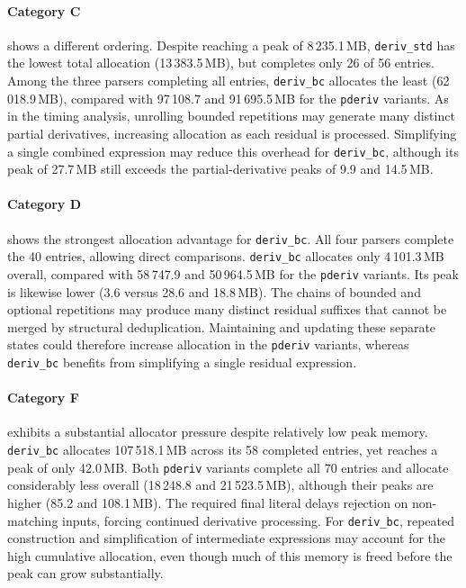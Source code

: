 \paragraph{Category C}
shows a different ordering.
Despite reaching a peak of 8\,235.1\,MB,
\texttt{deriv\_std} has the lowest total
allocation (13\,383.5\,MB), but completes
only 26 of 56 entries.
Among the three parsers completing all entries,
\texttt{deriv\_bc} allocates the least
(62\,018.9\,MB), compared with
97\,108.7 and 91\,695.5\,MB for
the \texttt{pderiv} variants.
As in the timing analysis, unrolling bounded
repetitions may generate many distinct
partial derivatives, increasing allocation
as each residual is processed.
Simplifying a single combined expression
may reduce this overhead for \texttt{deriv\_bc},
although its peak of 27.7\,MB still exceeds
the partial-derivative peaks of 9.9 and 14.5\,MB.

\paragraph{Category D}
shows the strongest allocation advantage
for \texttt{deriv\_bc}.
All four parsers complete the 40 entries,
allowing direct comparisons.
\texttt{deriv\_bc} allocates only
4\,101.3\,MB overall, compared with
58\,747.9 and 50\,964.5\,MB for
the \texttt{pderiv} variants.
Its peak is likewise lower
(3.6 versus 28.6 and 18.8\,MB).
The chains of bounded and optional repetitions
may produce many distinct residual suffixes
that cannot be merged by structural deduplication.
Maintaining and updating these separate states
could therefore increase allocation in the
\texttt{pderiv} variants, whereas
\texttt{deriv\_bc} benefits from simplifying
a single residual expression.

\paragraph{Category F}
exhibits a substantial allocator pressure
despite relatively low peak memory.
\texttt{deriv\_bc} allocates 107\,518.1\,MB
across its 58 completed entries,
yet reaches a peak of only 42.0\,MB.
Both \texttt{pderiv} variants complete all
70 entries and allocate considerably less
overall (18\,248.8 and 21\,523.5\,MB),
although their peaks are higher
(85.2 and 108.1\,MB).
The required final literal delays rejection
on non-matching inputs, forcing continued
derivative processing.
For \texttt{deriv\_bc}, repeated construction
and simplification of intermediate expressions
may account for the high cumulative allocation,
even though much of this memory is freed
before the peak can grow substantially.

